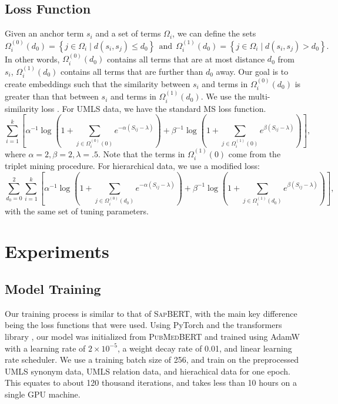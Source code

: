 \documentclass[12pt,a4paper]{cibb}
\begin{document}
\subsection{Loss Function}
Given an anchor term $s_i$ and a set of terms $\Omega_i$, we can define the sets 
$$
\Omega_i^{(0)}(d_0) = \left\{j \in \Omega_i \mid d(s_i,s_j) \le d_0 \right\} ~~\mbox{and}~~\Omega_i^{(1)}(d_0) = \left\{j \in \Omega_i \mid d(s_i,s_j) > d_0 \right\}. 
$$
In other words, $\Omega_i^{(0)}(d_0)$ contains all terms that are at most distance $d_0$ from $s_i$, $\Omega_i^{(1)}(d_0)$ contains all terms that are further than $d_0$ away. Our goal is to create embeddings such that the similarity between $s_i$ and terms in $\Omega_i^{(0)}(d_0)$ is greater than that between $s_i$ and terms in $\Omega_i^{(1)}(d_0)$. We use the multi-similarity loss \cite{msloss}. %
For UMLS data, we have the standard MS loss function.
\begin{equation*}
\sum_{i=1}^{k}\left[\alpha^{-1}\log \left(1+\sum_{j \in \Omega_i^{(0)}(0)} e^{-\alpha\left(S_{ij}-\lambda\right)}\right) +\beta^{-1}\log \left(1+\sum_{j \in \Omega_i^{(1)}(0)} e^{\beta\left(S_{ij}-\lambda\right)}\right)\right],
\end{equation*}
where $\alpha=2, \beta=2, \lambda=.5$. Note that the terms in $\Omega_i^{(1)}(0)$ come from the triplet mining procedure. For hierarchical data, we use a modified loss:
\begin{equation*}
\sum_{d_0=0}^{2} \sum_{i=1}^{k}\left[\alpha^{-1}\log \left(1+\sum_{j \in \Omega_i^{(0)}(d_0)} e^{-\alpha\left(S_{ij}-\lambda\right)}\right) +\beta^{-1}\log \left(1+\sum_{j \in \Omega_i^{(1)}(d_0)} e^{\beta\left(S_{ij}-\lambda\right)}\right)\right],
\end{equation*}
with the same set of tuning parameters.


\section{Experiments}
\subsection{Model Training}
Our training process is similar to that of \textsc{SapBERT}, with the main key difference being the loss functions that were used. Using PyTorch \cite{Paszke_PyTorch_An_Imperative_2019} and the transformers library \cite{Wolf_Transformers_State-of-the-Art_Natural_2020}, our model was initialized from \textsc{PubMedBERT} \cite{gu2020pubmedbert} and trained using AdamW \cite{loshchilov2019} with a learning rate of $2\times 10^{-5}$, a weight decay rate of 0.01, and linear learning rate scheduler. We use a training batch size of 256, and train on the preprocessed UMLS synonym data, UMLS relation data, and hierachical data for one epoch. This equates to about 120 thousand iterations, and takes less than 10 hours on a single GPU machine.
\end{document}
